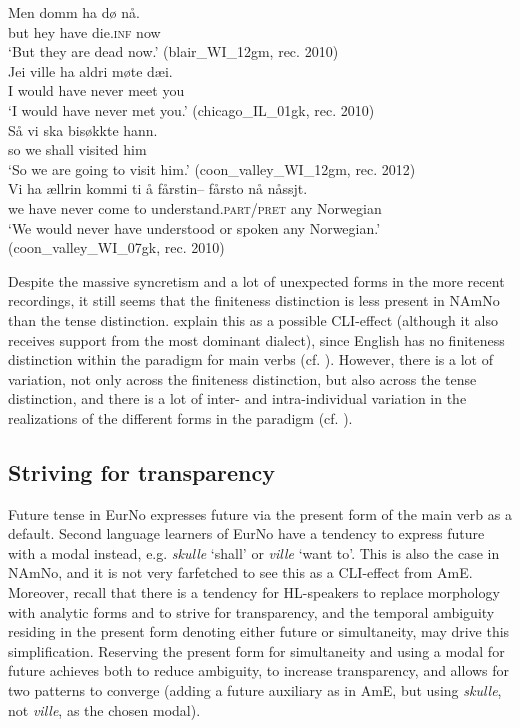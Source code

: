 \documentclass[output=paper]{langscibook}
\begin{document}
\ea\label{ex:eide:31}
	\ea 
	\gll Men domm ha dø  nå.\\
		 but hey have die.\textsc{inf} now\\
   \glt ‘But they are dead now.’ (blair\_WI\_12gm, rec. 2010)\\
	\ex 
	\gll Jei ville ha aldri møte dæi.\\
		 I would have never meet you\\
	\glt ‘I would have never met you.’  (chicago\_IL\_01gk, rec. 2010)\\
	\ex 
	\gll Så vi ska bisøkkte hann.\\
        so we shall visited him \\    
	\glt ‘So we are going to visit him.’ (coon\_valley\_WI\_12gm, rec. 2012)\\
	\ex 
	\gll Vi ha ællrin kommi ti å {fårstin– fårsto} nå nåssjt.\\
		 we have never come {} to understand.\textsc{part/pret} any Norwegian\\
    \glt ‘We would never have understood or spoken any Norwegian.’ ({{coon\_valley\_WI\_07gk}}, rec. 2010)\\
	\z
\z

Despite the massive syncretism and a lot of unexpected forms in the more recent recordings, it still seems that the finiteness distinction is less present in NAmNo than the tense distinction. \citet{EideHjelde2015Verb} explain this as a possible CLI-effect (although it also receives support from the most dominant dialect), since English has no finiteness distinction within the paradigm for main verbs (cf. ). However, there is a lot of variation, not only across the finiteness distinction, but also across the tense distinction, and there is a lot of inter- and intra-individual variation in the realizations of the different forms in the paradigm (cf. ). 

\subsection{Striving for transparency}\label{sec:eide:5.2}

Future tense in EurNo expresses future via the present form of the main verb as a default. Second language learners of EurNo have a tendency to express future with a modal instead, e.g. \textit{skulle} ‘shall’ or \textit{ville} ‘want to’. This is also the case in NAmNo, and it is not very farfetched to see this as a CLI-effect from AmE. Moreover, recall that there is a tendency for HL-speakers to replace morphology with analytic forms and to strive for transparency, and the temporal ambiguity residing in the present form denoting either future or simultaneity, may drive this simplification. Reserving the present form for simultaneity and using a modal for future achieves both to reduce ambiguity, to increase transparency, and allows for two patterns to converge (adding a future auxiliary as in AmE, but using \textit{skulle}, not \textit{ville}, as the chosen modal). 
\end{document}
